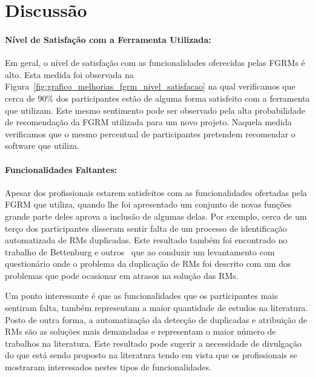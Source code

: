 \section{Discussão}

\paragraph{Nível de Satisfação com a Ferramenta Utilizada:}
\label{par:pesq_profissionais_nivel_de_satisfação}

Em geral, o nível de satisfação com as funcionalidades oferecidas pelas FGRMs é
alto. Esta medida foi observada na
Figura~\ref{fig:grafico_melhorias_fgrm_nivel_satisfacao} na qual verificamos que
cerca de 90\% dos participantes estão de alguma forma satisfeito com a
ferramenta que utilizam. Este mesmo sentimento pode ser observado pela alta
probabilidade de recomendação da FGRM utilizada para um novo projeto. Naquela
medida verificamos que o mesmo percentual de participantes pretendem recomendar
o software que utiliza.

\paragraph{Funcionalidades Faltantes:}
\label{par:pesq_profissionais_funcionalidades_faltantes}

Apesar dos profissionais estarem satisfeitos com as funcionalidades ofertadas
pela FGRM que utiliza, quando lhe foi apresentado um conjunto de novas funções
grande parte deles aprova a inclusão de algumas delas. Por exemplo, cerca de um
terço dos participantes disseram sentir falta de um processo de identificação
automatizada de RMs duplicadas. Este resultado também foi encontrado no trabalho
de Bettenburg e outros~\cite{bettenburg2008makes} que ao conduzir um
levantamento com questionário onde o problema da duplicação de RMs foi descrito
com um dos problemas que pode ocasionar em atrasos na solução das RMs.

Um ponto interessante é que as funcionalidades que os participantes mais
sentiram falta, também representam a maior quantidade de estudos na literatura.
Posto de outra forma, a automatização da detecção de duplicadas e atribuição de
RMs são as soluções mais demandadas e representam o maior número de trabalhos na
literatura. Este resultado pode sugerir a necessidade de divulgação do que está
sendo proposto na literatura tendo em vista que os profissionais se mostraram
interessados nestes tipos de funcionalidades.

